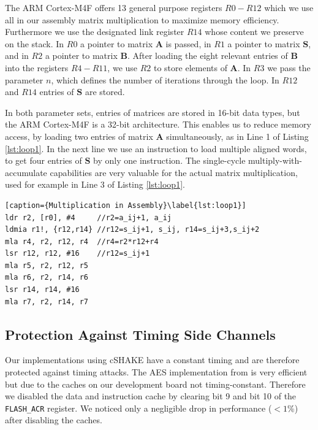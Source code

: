 The ARM Cortex-M4F offers 13 general purpose registers $R0-R12$ which we use all in our assembly matrix multiplication to maximize memory efficiency. Furthermore we use the designated link register $R14$ whose content we preserve on the stack. In $R0$ a pointer to matrix $\mathbf{A}$ is passed, in $R1$ a pointer to matrix $\mathbf{S}$, and in $R2$ a pointer to matrix $\mathbf{B}$. After loading the eight relevant entries of $\mathbf{B}$ into the registers $R4-R11$, we use $R2$ to store elements of $\mathbf{A}$. In $R3$ we pass the parameter $n$, which defines the number of iterations through the loop. In $R12$ and $R14$ entries of $\mathbf{S}$ are stored.

In both parameter sets, entries of matrices are stored in 16-bit data types, but the ARM Cortex-M4F is a 32-bit architecture. This enables us to reduce memory access, by loading two entries of matrix $\mathbf{A}$ simultaneously, as in Line 1 of Listing \ref{lst:loop1}. In the next line we use an instruction to load multiple aligned words, to get four entries of $\mathbf{S}$ by only one instruction. The single-cycle multiply-with-accumulate capabilities are very valuable for the actual matrix multiplication, used for example in Line 3 of Listing \ref{lst:loop1}.

\begin{lstlisting}[caption={Multiplication in Assembly}\label{lst:loop1}]
ldr r2, [r0], #4     //r2=a_ij+1, a_ij
ldmia r1!, {r12,r14} //r12=s_ij+1, s_ij, r14=s_ij+3,s_ij+2
mla r4, r2, r12, r4  //r4=r2*r12+r4
lsr r12, r12, #16    //r12=s_ij+1
mla r5, r2, r12, r5
mla r6, r2, r14, r6
lsr r14, r14, #16
mla r7, r2, r14, r7
\end{lstlisting}

\subsection{Protection Against Timing Side Channels}
Our implementations using cSHAKE have a constant timing and are therefore protected against timing attacks. The AES implementation from \cite{DBLP:conf/sacrypt/SchwabeS16} is very efficient but due to the caches on our development board not timing-constant. Therefore we disabled the data and instruction cache by clearing bit 9 and bit 10 of the \texttt{FLASH\_ACR} register. We noticed only a negligible drop in performance ($< 1$\%) after disabling the caches.
